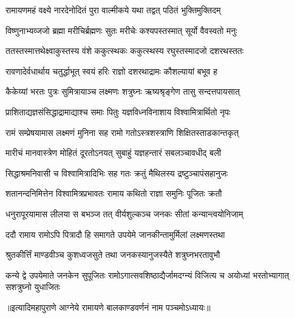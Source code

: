 
\vakta{}
\shrota{}
\notes{}
\translink{}

\storymeta


\twolineshloka
{रामायणमहं वक्ष्ये नारदेनोदितं पुरा}
{वाल्मीकये यथा तद्वत् पठितं भुक्तिमुक्तिदम्} %

\twolineshloka
{विष्णुनाभ्यव्जजो ब्रह्मा मरीचिर्ब्रह्मणः सुतः}
{मरीचेः कश्यपस्तस्मात् सूर्यो वैवस्वतो मनुः} %

\twolineshloka
{ततस्तस्मात्तथेक्ष्वाकुस्तस्य वंशे ककुत्स्थकः}
{ककुत्स्थस्य रघुस्तस्मादजो दशरथस्ततः} %

\twolineshloka
{रावणादेर्वधार्थाय चतुर्द्धाभूत् स्वयं हरिः}
{राज्ञो दशरथाद्रामः कौशल्यायां बभूव ह} %

\twolineshloka
{कैकेय्यां भरतः पुत्रः सुमित्रायाञ्च लक्ष्मणः}
{शत्रुघ्नः ऋष्यश्रृङ्गेण तासु सन्दत्तपायसात्} %

\twolineshloka
{प्राशिताद्यज्ञसंसिद्धाद्रामाद्याश्च समाः पितुः}
{यज्ञविध्नविनाशाय विश्वामित्रार्थितो नृपः} %

\twolineshloka
{रामं सम्प्रेषयामास लक्ष्मणं मुनिना सह}
{रामो गतोऽस्त्रशस्त्राणि शिक्षितस्ताडकान्तकृत्} %

\twolineshloka
{मारीचं मानवास्त्रेण मोहितं दूरतोऽनयत्}
{सुबाहुं यज्ञहन्तारं सबलञ्चावधीद् बली} %

\twolineshloka
{सिद्धाश्रमनिवासी च विश्वामित्रादिभिः सह}
{गतः क्रतुं मैथिलस्य द्रष्टुञ्चापंसहानुजः} %

\twolineshloka
{शतानन्दनिमित्तेन विश्वामित्रप्रभावतः}
{रामाय कथितो राज्ञा समुनिः पूजितः क्रतौ} %

\twolineshloka
{धनुरापूरयामास लीलया स बभञ्ज तत् }
{वीर्यशुल्कञ्च जनकः सीतां कन्यान्त्वयोनिजाम्} %

\twolineshloka
{ददौ रामाय रामोऽपि पित्रादौ हि समागते}
{उपयेमे जानकीन्तामुर्मिलां लक्ष्मणस्तथा} %

\twolineshloka
{श्रुतकीर्त्तिं माण्डवीञ्च कुशध्वजसुते तथा}
{जनकस्यानुजस्यैते शत्रुघ्नभरतावुभौ} %

\threelineshloka
{कन्ये द्वे उपयेमाते जनकेन सुपूजितः}
{रामोऽगात्सवशिष्ठाद्यैर्जामदग्न्यं विजित्य च}
{अयोध्यां भरतोभ्यागात् सशत्रुघ्नो युधाजितः} %

॥इत्यादिमहापुराणे आग्नेये रामायणे बालकाण्डवर्णनं नाम पञ्चमोऽध्यायः॥


